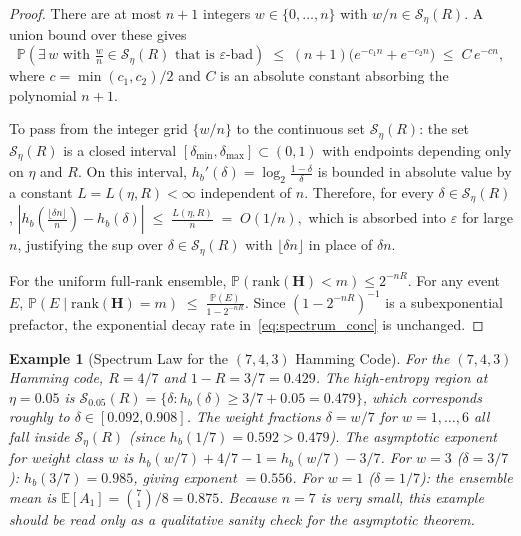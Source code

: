\documentclass[journal,10pt,onecolumn]{IEEEtran}
\newtheorem{example}{Example}
\newcommand{\Eb}{\mathbb{E}}
\newcommand{\Pb}{\mathbb{P}}
\newcommand{\Hb}{h_b}
\newcommand{\Seta}{\mathcal{S}}
\newcommand{\eps}{\varepsilon}
\newcommand{\Hm}{\mathbf{H}}
\begin{document}
\begin{proof}
 

There are at most $n+1$ integers $w\in\{0,\ldots,n\}$
with $w/n\in\Seta_\eta(R)$.
A union bound over these gives
\[
\Pb\!\left(\exists\, w \text{ with } \tfrac{w}{n}\in\Seta_\eta(R) 
\text{ that is $\varepsilon$-bad}\right)
\;\le\;
(n+1)\bigl(e^{-c_1 n}+e^{-c_2 n}\bigr)
\;\le\;
C\,e^{-cn},
\]
where $c=\min(c_1,c_2)/2$ and $C$ is an absolute constant
absorbing the polynomial $n+1$.

To pass from the integer grid $\{w/n\}$ to the continuous
set $\Seta_\eta(R)$: the set $\Seta_\eta(R)$ is a closed
interval $[\delta_{\min},\delta_{\max}]\subset(0,1)$ with
endpoints depending only on $\eta$ and $R$.
On this interval, $\Hb'(\delta)=\log_2\frac{1-\delta}{\delta}$
is bounded in absolute value by a constant $L=L(\eta,R)<\infty$
independent of $n$.
Therefore, for every $\delta\in\Seta_\eta(R)$,
\(
    \left|\Hb\!\left(\tfrac{\lfloor\delta n\rfloor}{n}\right)
    -\Hb(\delta)\right|
    \;\le\;
    \frac{L(\eta,R)}{n}
    \;=\;
    O(1/n),
\)
which is absorbed into $\eps$ for large $n$, justifying the
sup over $\delta\in\Seta_\eta(R)$ with $\lfloor\delta n\rfloor$
in place of $\delta n$.

For the uniform full-rank ensemble,
$\Pb(\mathrm{rank}(\Hm)<m)\le 2^{-nR}$.
For any event $E$,
\(
    \Pb(E \mid \mathrm{rank}(\Hm)=m)
    \;\le\;
    \frac{\Pb(E)}{1-2^{-nR}}.
\)
Since $(1-2^{-nR})^{-1}$ is a subexponential prefactor, the
exponential decay rate in~\eqref{eq:spectrum_conc} is unchanged.
\end{proof}

\begin{example}[Spectrum Law for the $(7,4,3)$ Hamming Code]
\label{ex:hamming_spectrum}
For the $(7,4,3)$ Hamming code, $R=4/7$ and $1-R=3/7 = 0.429$.
The high-entropy region at $\eta=0.05$ is
$\Seta_{0.05}(R)=\{\delta:\Hb(\delta)\ge3/7+0.05 = 0.479\}$,
which corresponds roughly to $\delta\in[0.092,0.908]$.
The weight fractions $\delta=w/7$ for $w=1,\ldots,6$ all fall inside
$\Seta_\eta(R)$ (since $\Hb(1/7) = 0.592>0.479$).
The asymptotic exponent for weight class $w$ is
$\Hb(w/7)+4/7-1=\Hb(w/7)-3/7$.
For $w=3$ ($\delta=3/7$): $\Hb(3/7) = 0.985$, giving
exponent $ = 0.556$.
For $w=1$ ($\delta=1/7$): the ensemble mean is
$\Eb[A_1]=\binom{7}{1}/8=0.875$.
Because $n=7$ is very small, this example should be read only as a
qualitative sanity check for the asymptotic theorem.
\end{example}


\end{document}
